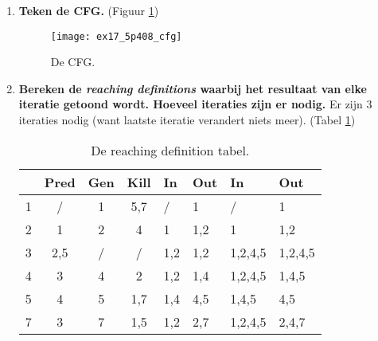 \begin{enumerate}
	\item \textbf{Teken de CFG.} (Figuur \ref{fig:ex17_5p408_cfg})
	\begin{figure}[ht]
		\centering
		\texttt{[image: ex17\_5p408\_cfg]}
		\caption{De CFG.}
		\label{fig:ex17_5p408_cfg}
	\end{figure}
	\item \textbf{Bereken de \textit{reaching definitions} waarbij het resultaat van elke iteratie getoond wordt. Hoeveel iteraties zijn er nodig.}
	Er zijn 3 iteraties nodig (want laatste iteratie verandert niets meer). (Tabel \ref{table:reaching_definitions})
	\begin{table}[ht]
		\centering
		\begin{tabular}{| c | c c c || l l | l l|}
			\hline
				& Pred 	& Gen 	& Kill 	&	In	&	Out		&	In 	&	Out		\\
			\hline
			1	&	/	&	1	&	5,7	&	/	&	1		&	/	&	1		\\
			2	&	1	&	2	&	4	&	1	&	1,2		&	1	&	1,2		\\
			3	&	2,5	&	/	&	/	&	1,2	&	1,2		&1,2,4,5&	1,2,4,5	\\
			4	&	3	&	4	&	2	&	1,2	&	1,4		&1,2,4,5&	1,4,5	\\
			5	&	4	&	5	&	1,7	&	1,4	&	4,5		&1,4,5	&	4,5		\\
			7	&	3	&	7	&	1,5	&	1,2	&	2,7		&1,2,4,5&	2,4,7		\\
			\hline
		\end{tabular}
		\caption{De reaching definition tabel.}
		\label{table:reaching_definitions}
	\end{table}
\end{enumerate}